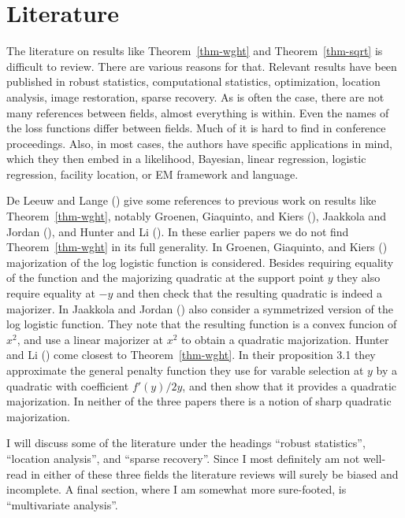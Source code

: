 \documentclass[
  12pt,
  letterpaper,
  DIV=11,
  numbers=noendperiod]{scrartcl}
\newcommand{\sectionbreak}{\pagebreak}
\theoremstyle{definition}
\theoremstyle{definition}
\theoremstyle{plain}
\theoremstyle{plain}
\theoremstyle{plain}
\theoremstyle{remark}
\begin{document}
\sectionbreak

\section{Literature}\label{sec-literature}

The literature on results like Theorem~\ref{thm-wght} and
Theorem~\ref{thm-sqrt} is difficult to review. There are various reasons
for that. Relevant results have been published in robust statistics,
computational statistics, optimization, location analysis, image
restoration, sparse recovery. As is often the case, there are not many
references between fields, almost everything is within. Even the names
of the loss functions differ between fields. Much of it is hard to find
in conference proceedings. Also, in most cases, the authors have
specific applications in mind, which they then embed in a likelihood,
Bayesian, linear regression, logistic regression, facility location, or
EM framework and language.

De Leeuw and Lange () give some
references to previous work on results like Theorem~\ref{thm-wght},
notably Groenen, Giaquinto, and Kiers
(), Jaakkola and Jordan
(), and Hunter and Li
(). In these earlier papers we do not
find Theorem~\ref{thm-wght} in its full generality. In Groenen,
Giaquinto, and Kiers ()
majorization of the log logistic function is considered. Besides
requiring equality of the function and the majorizing quadratic at the
support point \(y\) they also require equality at \(-y\) and then check
that the resulting quadratic is indeed a majorizer. In Jaakkola and
Jordan () also consider a
symmetrized version of the log logistic function. They note that the
resulting function is a convex funcion of \(x^2\), and use a linear
majorizer at \(x^2\) to obtain a quadratic majorization. Hunter and Li
() come closest to
Theorem~\ref{thm-wght}. In their proposition 3.1 they approximate the
general penalty function they use for varable selection at \(y\) by a
quadratic with coefficient \(f'(y)/2y\), and then show that it provides
a quadratic majorization. In neither of the three papers there is a
notion of sharp quadratic majorization.

I will discuss some of the literature under the headings ``robust
statistics'', ``location analysis'', and ``sparse recovery''. Since I
most definitely am not well-read in either of these three fields the
literature reviews will surely be biased and incomplete. A final
section, where I am somewhat more sure-footed, is ``multivariate
analysis''.
\end{document}
